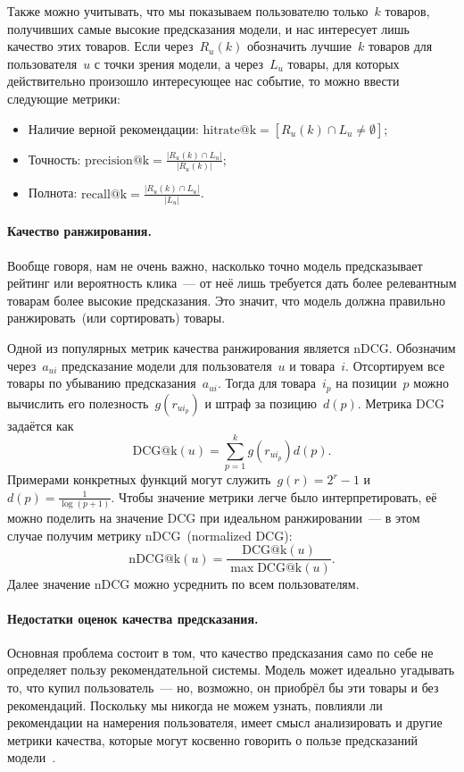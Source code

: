 \documentclass[12pt,fleqn]{article}
\begin{document}
Также можно учитывать, что мы показываем пользователю только~$k$ товаров, получивших самые высокие
предсказания модели, и нас интересует лишь качество этих товаров.
Если через~$R_u(k)$ обозначить лучшие~$k$ товаров для пользователя~$u$ с точки зрения модели,
а через~$L_u$ товары, для которых действительно произошло интересующее нас событие,
то можно ввести следующие метрики:
\begin{itemize}
    \item Наличие верной рекомендации: $\text{hitrate@k} = [R_u(k) \cap L_u \neq \emptyset]$;
    \item Точность: $\text{precision@k} = \frac{|R_u(k) \cap L_u|}{|R_u(k)|}$;
    \item Полнота: $\text{recall@k} = \frac{|R_u(k) \cap L_u|}{|L_u|}$.
\end{itemize}

\paragraph{Качество ранжирования.}
Вообще говоря, нам не очень важно, насколько точно модель предсказывает рейтинг или вероятность клика~---
от неё лишь требуется дать более релевантным товарам более высокие предсказания.
Это значит, что модель должна правильно ранжировать~(или сортировать) товары.

Одной из популярных метрик качества ранжирования является nDCG.
Обозначим через~$a_{ui}$ предсказание модели для пользователя~$u$ и товара~$i$.
Отсортируем все товары по убыванию предсказания~$a_{ui}$.
Тогда для товара~$i_p$ на позиции~$p$ можно вычислить его полезность~$g(r_{ui_p})$
и штраф за позицию~$d(p)$.
Метрика DCG задаётся как
\[
    \text{DCG@k}(u)
    =
    \sum_{p = 1}^{k}
        g(r_{ui_p}) d(p).
\]
Примерами конкретных функций могут служить~$g(r) = 2^{r} - 1$ и~$d(p) = \frac{1}{\log(p + 1)}$.
Чтобы значение метрики легче было интерпретировать, её можно поделить на значение DCG
при идеальном ранжировании~--- в этом случае получим метрику nDCG~(normalized DCG):
\[
    \text{nDCG@k}(u)
    =
    \frac{
        \text{DCG@k}(u)
    }{
        \max \text{DCG@k}(u)
    }.
\]
Далее значение nDCG можно усреднить по всем пользователям.

\paragraph{Недостатки оценок качества предсказания.}
Основная проблема состоит в том, что качество предсказания само по себе не определяет
пользу рекомендательной системы.
Модель может идеально угадывать то, что купил пользователь~--- но, возможно, он приобрёл бы
эти товары и без рекомендаций.
Поскольку мы никогда не можем узнать, повлияли ли рекомендации на намерения пользователя,
имеет смысл анализировать и другие метрики качества, которые могут косвенно
говорить о пользе предсказаний модели~\cite{shani11eval}.
\end{document}
